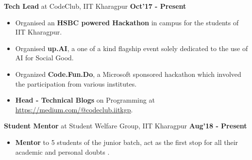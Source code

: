 \documentclass[10pt]{article}
\begin{document}
\vspace{-0.3ex}
\spacedhrule{0.15ex}{2.0ex}
\vspace{-1ex}
\large { \textbf{Tech Lead} at CodeClub, IIT Kharagpur} \normalsize
\href{https://github.com/shmundhra/Credentials/tree/master/Positions\%20of\%20Responsibility} {\hspace{0.5ex}\faMousePointer}
{\hfill} \textbf{Oct'17 - Present}\\[-1.8em]
\begin{itemize}
    \item Organised an \textbf{HSBC powered Hackathon} in campus for the students of IIT Kharagpur.\\[-2em]
    \item Organised \textbf{up.AI}, a one of a kind flagship event solely dedicated to the use of AI for Social Good.\\[-2em]
    \item Organized \textbf{Code.Fun.Do}, a Microsoft sponsored hackathon which involved the participation from various institutes.\\[-2em]
    \item \textbf{Head - Technical Blogs} on Programming at 
    \href{https://medium.com/@codeclub.iitkgp}    {https://medium.com/@codeclub.iitkgp}.
\end{itemize}
\large { \textbf{Student Mentor} at Student Welfare Group, IIT Kharagpur} \normalsize
\href{https://github.com/shmundhra/Credentials/tree/master/Positions\%20of\%20Responsibility} {\hspace{0.5ex}\faMousePointer}
{\hfill} \textbf{Aug'18 - Present}\\[-1.8em]
\begin{itemize}
    \item \textbf{Mentor} to 5 students of the junior batch, act as the first stop for all their academic and personal doubts %
    .
\end{itemize}
\end{document}
